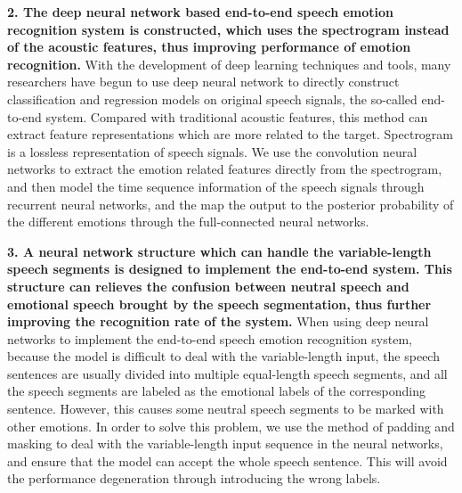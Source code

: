 \begin{eabstract}
\textbf{2. The deep neural network based end-to-end speech emotion recognition system is constructed, which uses the spectrogram instead of the acoustic features, thus improving performance of emotion recognition.}  With the development of deep learning techniques and tools, many researchers have begun to use deep neural network to directly construct classification and regression models on original speech signals, the so-called end-to-end system. Compared with traditional acoustic features, this method can extract feature representations which are more related to the target. Spectrogram is a lossless representation of speech signals. We use the convolution neural networks to extract the emotion related features directly from the spectrogram,  and then model the time sequence information of the speech signals through recurrent neural networks, and the map the output to the posterior probability of the different emotions through the full-connected neural networks. 

\textbf{3. A neural network structure which can handle the variable-length speech segments is designed to implement the end-to-end system. This structure can relieves the confusion between neutral speech and emotional speech brought by the speech segmentation, thus further improving the recognition rate of the system.} When using deep neural networks to implement the end-to-end speech emotion recognition system, because the model is difficult to deal with the variable-length input, the speech sentences are usually divided into multiple equal-length speech segments, and all the speech segments are labeled as the emotional labels of the corresponding sentence. However, this causes some neutral speech segments to be marked with other emotions. In order to solve this problem, we use the method of padding and masking to deal with the variable-length input sequence in the neural networks, and ensure that the model can accept the whole speech sentence. This will avoid the performance degeneration through introducing the wrong labels. 

\end{eabstract}

